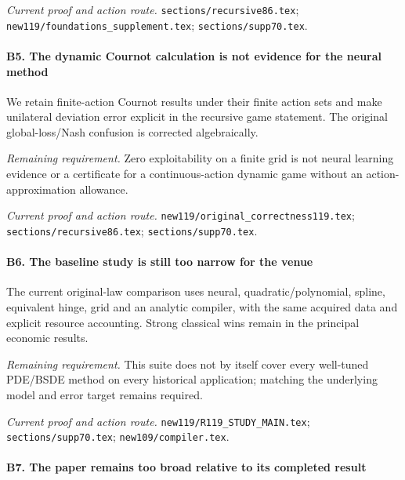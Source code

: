 \par\emph{Current proof and action route.} \nolinkurl{sections/recursive86.tex}; \nolinkurl{new119/foundations_supplement.tex}; \nolinkurl{sections/supp70.tex}.

\paragraph{B5. The dynamic Cournot calculation is not evidence for the neural method}

We retain finite-action Cournot results under their finite action sets and make unilateral deviation error explicit in the recursive game statement. The original global-loss/\allowbreak{}Nash confusion is corrected algebraically.

\par\emph{Remaining requirement.} Zero exploitability on a finite grid is not neural learning evidence or a certificate for a continuous-action dynamic game without an action-approximation allowance.

\par\emph{Current proof and action route.} \nolinkurl{new119/original_correctness119.tex}; \nolinkurl{sections/recursive86.tex}; \nolinkurl{sections/supp70.tex}.

\paragraph{B6. The baseline study is still too narrow for the venue}

The current original-law comparison uses neural, quadratic/\allowbreak{}polynomial, spline, equivalent hinge, grid and an analytic compiler, with the same acquired data and explicit resource accounting. Strong classical wins remain in the principal economic results.

\par\emph{Remaining requirement.} This suite does not by itself cover every well-tuned PDE/\allowbreak{}BSDE method on every historical application; matching the underlying model and error target remains required.

\par\emph{Current proof and action route.} \nolinkurl{new119/R119_STUDY_MAIN.tex}; \nolinkurl{sections/supp70.tex}; \nolinkurl{new109/compiler.tex}.

\paragraph{B7. The paper remains too broad relative to its completed result}

